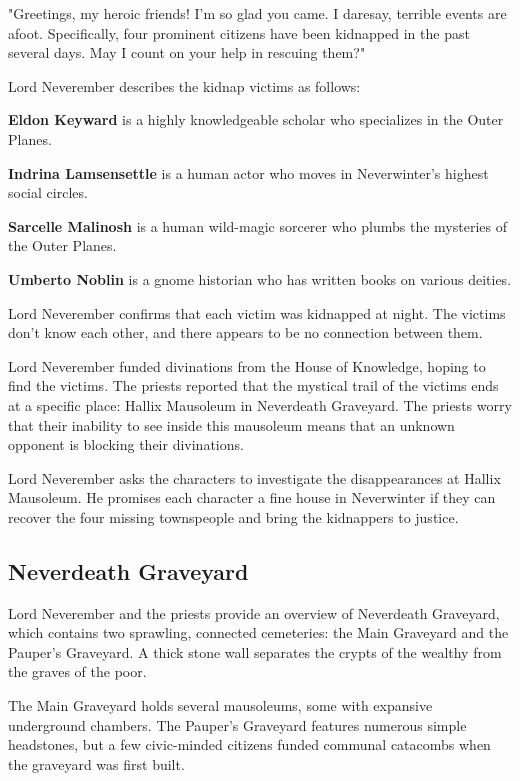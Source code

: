 \documentclass[10pt,a4paper,twoside,bg=print,twocolumn,openany,nodeprecatedcode]{dndbook}
\begin{document}
\begin{DndReadAloud}{}
"Greetings, my heroic friends! I'm so glad you came. I daresay, terrible events are afoot. Specifically, four prominent citizens have been kidnapped in the past several days. May I count on your help in rescuing them?"

\end{DndReadAloud}

Lord Neverember describes the kidnap victims as follows:

\textbf{Eldon Keyward} is a highly knowledgeable scholar who specializes in the Outer Planes.

\textbf{Indrina Lamsensettle} is a human actor who moves in Neverwinter's highest social circles.

\textbf{Sarcelle Malinosh} is a human wild-magic sorcerer who plumbs the mysteries of the Outer Planes.

\textbf{Umberto Noblin} is a gnome historian who has written books on various deities.

Lord Neverember confirms that each victim was kidnapped at night. The victims don't know each other, and there appears to be no connection between them.

Lord Neverember funded divinations from the House of Knowledge, hoping to find the victims. The priests reported that the mystical trail of the victims ends at a specific place: Hallix Mausoleum in Neverdeath Graveyard. The priests worry that their inability to see inside this mausoleum means that an unknown opponent is blocking their divinations.

Lord Neverember asks the characters to investigate the disappearances at Hallix Mausoleum. He promises each character a fine house in Neverwinter if they can recover the four missing townspeople and bring the kidnappers to justice.

\subsection{Neverdeath Graveyard}
Lord Neverember and the priests provide an overview of Neverdeath Graveyard, which contains two sprawling, connected cemeteries: the Main Graveyard and the Pauper's Graveyard. A thick stone wall separates the crypts of the wealthy from the graves of the poor.

The Main Graveyard holds several mausoleums, some with expansive underground chambers. The Pauper's Graveyard features numerous simple headstones, but a few civic-minded citizens funded communal catacombs when the graveyard was first built.
\end{document}
